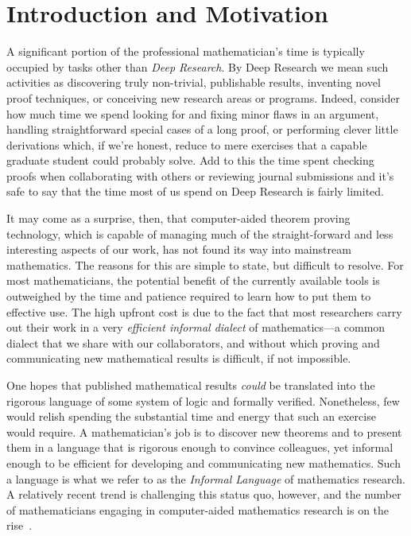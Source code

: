 \documentclass[11pt]{amsart}  %
\begin{document}
\clearpage

\section{Introduction and Motivation}
A significant portion of the professional mathematician's time is typically occupied by tasks other than \textit{Deep Research}. By Deep Research we mean such activities as discovering truly non-trivial, publishable results, inventing novel proof techniques, or conceiving new research areas or programs. Indeed, consider how much time we spend looking for and fixing minor flaws in an argument, handling straightforward special cases of a long proof, or performing clever little derivations which, if we're honest, reduce to mere exercises that a capable graduate student could probably solve.  Add to this the time spent checking proofs when collaborating with others or reviewing journal submissions and it's safe to say that the time most of us spend on Deep Research is fairly limited.

It may come as a surprise, then, that computer-aided theorem proving technology, which is capable of managing much of the straight-forward and less interesting aspects of our work, has not found its way into mainstream mathematics. The reasons for this are simple to state, but difficult to resolve. For most mathematicians, the potential benefit of the currently available tools is outweighed by the time and patience required to learn how to put them to effective use.  The high upfront cost is due to the fact that most researchers carry out their work in a very \emph{efficient informal dialect} of mathematics---a common dialect that we share with our collaborators, and without which proving and communicating new mathematical results is difficult, if not impossible.

One hopes that published mathematical results \emph{could} be translated into  the rigorous language of some system of logic and formally verified. Nonetheless, few would relish spending the substantial time and energy that such an exercise would require. A mathematician's job is to discover new theorems and to present them in a language that is rigorous enough to convince colleagues, yet informal enough to be efficient for developing and communicating new mathematics. Such a language is what we refer to as the \emph{Informal Language} of mathematics research. A relatively recent trend is challenging this status quo, however, and the number of mathematicians engaging in computer-aided mathematics research is on the rise~\cite{gowers:2017,harris:2015,pierce:2009}. 
\end{document}
